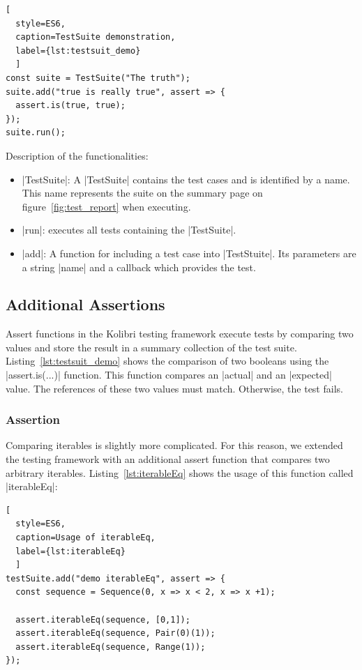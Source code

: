 \begin{lstlisting}[
  style=ES6, 
  caption=TestSuite demonstration,
  label={lst:testsuit_demo}
  ]
const suite = TestSuite("The truth");
suite.add("true is really true", assert => {
  assert.is(true, true);
});
suite.run();
\end{lstlisting}

Description of the functionalities: 

\begin{itemize}
  \item{|TestSuite|: A |TestSuite| contains the test cases and is identified by a
    name. This name represents the suite on the summary page on
  figure~\ref{fig:test_report} when executing.}
  \item{|run|: executes all tests containing the |TestSuite|.}
  \item{|add|: A function for including a test case into |TestStuite|. Its
      parameters are a string |name| and a callback which provides the test.}
\end{itemize}

\subsection{Additional Assertions}
\label{sub:Additional Assertions}

Assert functions in the Kolibri testing framework execute tests by comparing
two values and store the result in a summary collection of the test suite.
Listing~\ref{lst:testsuit_demo} shows the comparison of two booleans using the
|assert.is(...)| function.
This function compares an |actual| and an |expected| value. The references of
these two values must match. Otherwise, the test fails.

\subsubsection{Assertion}
\label{subsub:Assertion for Iterables}
Comparing iterables is slightly more complicated. For this reason, we extended
the testing framework with an additional assert function that compares two
arbitrary iterables. Listing~\ref{lst:iterableEq} shows the usage of this
function called |iterableEq|:

\begin{lstlisting}[
  style=ES6, 
  caption=Usage of iterableEq,
  label={lst:iterableEq}
  ]
testSuite.add("demo iterableEq", assert => {
  const sequence = Sequence(0, x => x < 2, x => x +1);

  assert.iterableEq(sequence, [0,1]);
  assert.iterableEq(sequence, Pair(0)(1));
  assert.iterableEq(sequence, Range(1));
});  
\end{lstlisting}

